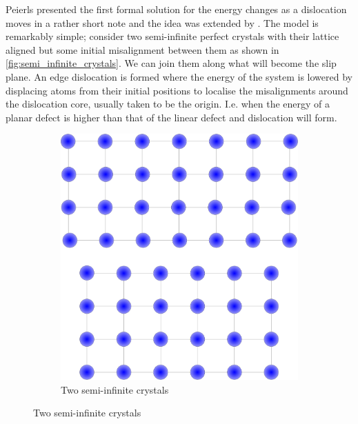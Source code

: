 Peierls presented the first formal solution for the energy changes as a dislocation moves in a rather short note \cite{Peierls1940} and the idea was extended by \citet{Nabarro1947}. The model is remarkably simple; consider two semi-infinite perfect crystals with their lattice aligned but some initial misalignment between them as shown in \autoref{fig:semi_infinite_crystals}. We can join them along what will become the slip plane. An edge dislocation is formed where the energy of the system is lowered by displacing atoms from their initial positions to localise the misalignments around the dislocation core, usually taken to be the origin. I.e. when the energy of a planar defect is higher than that of the linear defect and dislocation will form.


\begin{figure}
\centering

    \begin{subfigure}{0.4\textwidth}
        \includegraphics[width=\textwidth]{Half_crystals}
        \caption{Two semi-infinite crystals \label{fig:semi_infinite_crystals}}
    \end{subfigure}


\end{figure}
